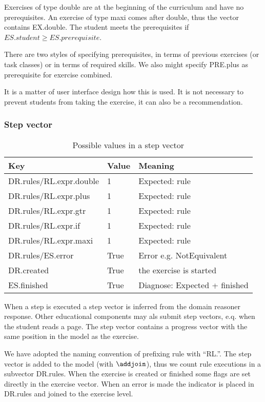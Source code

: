 Exercises of type double are at the beginning of the curriculum and have no prerequisites.
An exercise of type maxi comes after double, thus the vector contains EX.double.
The student meets the prerequisites if $\mathit{ES.student \geq  ES.prerequisite}$.

There are two styles of specifying prerequisites, in terms of previous exercises (or task classes) or in terms of required skills.
We also might specify PRE.plus as prerequisite for exercise combined.

It is a matter of user interface design how this is used.
It is not necessary to prevent students from taking the exercise, it can also be a recommendation.

\subsubsection{Step vector}
\begin{table}[H]
\begin{tabular}{| l | l | l |}
\hline
Key & Value& Meaning\\
\hline
DR.rules/RL.expr.double& 1&  Expected: rule\\
DR.rules/RL.expr.plus& 1& Expected: rule\\
DR.rules/RL.expr.gtr& 1& Expected: rule\\
DR.rules/RL.expr.if& 1& Expected: rule\\
DR.rules/RL.expr.maxi& 1& Expected: rule\\
DR.rules/ES.error & True & Error e.g. NotEquivalent\\
DR.created & True & the exercise is started\\
ES.finished & True& Diagnose: Expected + finished\\
\hline
\end{tabular}
\caption{Possible values in a step vector}
\label{double.step}
\end{table}

When a step is executed a step vector is inferred from the domain reasoner response.
Other educational components may als submit step vectors, e.q. when the student reads a page.
The step vector contains a progress vector with the same position in the model as the exercise.

We have adopted the naming convention of prefixing rule with ``RL.''.
The step vector is added to the model (with $\addjoin$), thus we count rule executions in a subvector DR.rules.
When the exercise is created or finished some flags are set directly in the exercise vector.
When an error is made the indicator is placed in DR.rules and joined to the exercise level.

